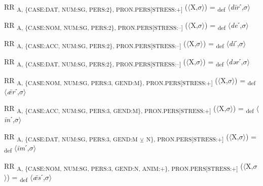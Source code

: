 {\begin{exe}
 RR \textsubscript{A, \{CASE:DAT, NUM:SG, PERS:2\}, PRON.PERS[STRESS:+]} ($\langle$X,$\sigma $$\rangle$) = \textsubscript{def} $\langle$\textit{d\=ir}ˊ,$\sigma $$\rangle$
\end{exe}

\begin{exe}
 RR \textsubscript{A, \{CASE:NOM, NUM:SG, PERS:2\}, PRON.PERS[STRESS:–]} ($\langle$X,$\sigma $$\rangle$) = \textsubscript{def} $\langle$\textit{de}ˊ,$\sigma $$\rangle$
\end{exe}

\begin{exe}
 RR \textsubscript{A, \{CASE:ACC, NUM:SG, PERS:2\}, PRON.PERS[STRESS:–]} ($\langle$X,$\sigma $$\rangle$) = \textsubscript{def} $\langle$\textit{di}ˊ,$\sigma $$\rangle$
\end{exe}

\begin{exe}
 RR \textsubscript{A, \{CASE:DAT, NUM:SG, PERS:2\}, PRON.PERS[STRESS:–]} ($\langle$X,$\sigma $$\rangle$) = \textsubscript{def} $\langle$\textit{dər}ˊ,$\sigma $$\rangle$
\end{exe}

\begin{exe}
 RR \textsubscript{A, \{CASE:NOM, NUM:SG, PERS:3, GEND:M\}, PRON.PERS[STRESS:+]} ($\langle$X,$\sigma $$\rangle$) = \textsubscript{def} $\langle$\textit{ǣr}ˊ,$\sigma $$\rangle$
\end{exe}

\begin{exe}
 RR \textsubscript{A, \{CASE:ACC, NUM:SG, PERS:3, GEND:M\}, PRON.PERS[STRESS:+]} ($\langle$X,$\sigma $$\rangle$) = \textsubscript{def} $\langle$\textit{\=in}ˊ,$\sigma $$\rangle$
\end{exe}

\begin{exe}
 RR \textsubscript{A, \{CASE:DAT, NUM:SG, PERS:3, GEND:M} \textsubscript{${\veebar}$}\textsubscript{ N\}, PRON.PERS[STRESS:+]} ($\langle$X,$\sigma $$\rangle$) = \textsubscript{def} $\langle$\textit{\=im}ˊ,$\sigma $$\rangle$
\end{exe}

\begin{exe}
 RR \textsubscript{A, \{CASE:NOM, NUM:SG, PERS:3, GEND:N, ANIM:+\}, PRON.PERS[STRESS:+]} ($\langle$X,$\sigma $$\rangle$) = \textsubscript{def} $\langle$\textit{ǣs}ˊ,$\sigma $$\rangle$
\end{exe}

}
